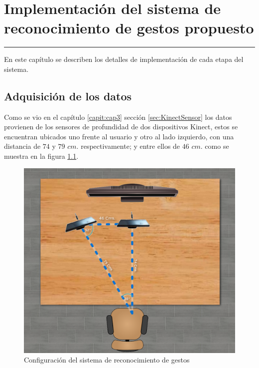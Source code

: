 \chapter{Implementación del sistema de reconocimiento de gestos propuesto}\label{capit:cap4}
\vspace{-2.0325ex}%
\noindent
\rule{\textwidth}{0.5pt}
\vspace{-5.5ex}%
\newcommand{\pushline}{\Indp}%


En este cap\'itulo se describen los detalles de implementación de cada etapa del sistema.   


\section{Adquisición de los datos}\label{sec:AdquisicionDatos}

Como se vio en el capítulo \ref{capit:cap3} sección \ref{sec:KinectSensor} los datos provienen de los sensores de profundidad de dos dispositivos Kinect, estos se encuentran ubicados uno frente al usuario y otro al lado  izquierdo, con una distancia de $74$ y $79$ $cm.$ respectivamente; y entre ellos de $46$ $cm.$ como se muestra en la figura \ref{fig:SetupSystem}.
\begin{figure}[!h]
\begin{center}
\includegraphics[scale=.2]{./Figures/system.png}
\end{center}
\caption{Configuración del sistema de reconocimiento de gestos}
\label{fig:SetupSystem}
\end{figure}  

